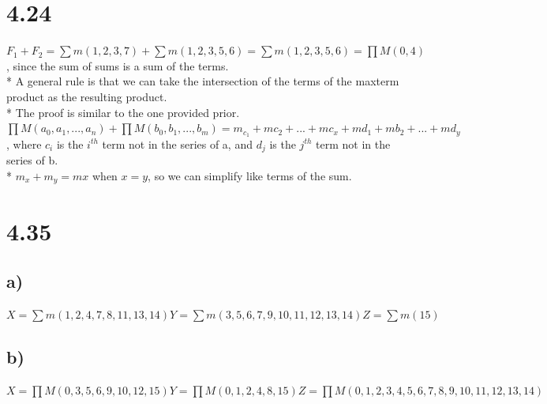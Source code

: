 \documentclass{article}
\begin{document}
\section{4.24}
$F_1 + F_2 = \sum m(1,2,3,7) + \sum m(1,2,3,5,6) = \sum m(1,2,3,5,6) = \prod M(0,4)$,
since the sum of sums is a sum of the terms.
\\*
A general rule is that we can take the intersection of the terms of the maxterm product as the resulting product.
\\*
The proof is similar to the one provided prior. 
$\prod M(a_0, a_1, ..., a_n) +
\prod M(b_0, b_1, ..., b_m)
= m_{c_1} + m{c_2} + ... + m{c_x} + m{d_1} + m{b_2} + ... + m{d_y}$, where $c_i$ is the $i^{th}$ term not in the series of a, and $d_j$ is the $j^{th}$ term not in the series of b.
\\*
$m_{x} + m_{y} = m{x}$ when $x = y$, so we can simplify like terms of the sum.

\section{4.35}
\subsection{a)}
$X = \sum m(1,2,4,7,8,11,13,14)
Y = \sum m(3,5,6,7,9,10,11,12,13,14)
Z = \sum m(15)
$

\subsection{b)}
$X = \prod M(0,3,5,6,9,10,12,15)
Y = \prod M(0,1,2,4,8,15)
Z = \prod M(0,1,2,3,4,5,6,7,8,9,10,11,12,13,14)
$
\end{document}
